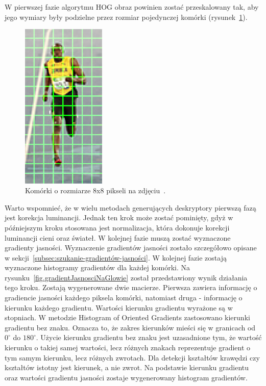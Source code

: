 \documentclass[a4paper,twoside,12pt]{book}
\begin{document}
    W pierwszej fazie algorytmu HOG obraz powinien zostać przeskalowany tak, aby jego wymiary były podzielne przez
    rozmiar
    pojedynczej komórki
    (rysunek~\ref{fig.komorkiHoga}).
    \begin{figure}
        \centering
        \includegraphics[width=4cm]{Obrazy/komorkiHoga.jpg}
        \caption{Komórki o rozmiarze 8x8 pikseli na zdjęciu~\cite{hogOpenCv}.}
        \label{fig.komorkiHoga}
    \end{figure}
    Warto wspomnieć, że w wielu metodach generujących deskryptory pierwszą fazą jest korekcja luminancji.
    Jednak ten krok może zostać pominięty, gdyż w późniejszym kroku stosowana jest normalizacja,
    która dokonuje korekcji luminancji cieni oraz świateł.
    W kolejnej fazie muszą zostać wyznaczone gradienty jasności.
    Wyznaczenie gradientów jasności zostało szczegółowo opisane w sekcji~\ref{subsec:szukanie-gradientów-jasności}.
    W kolejnej fazie zostają wyznaczone histogramy gradientów dla każdej komórki.
    Na rysunku~\ref{fig.gradientJasnosciNaGlowie} został przedstawiony wynik działania tego kroku.
    Zostają wygenerowane dwie macierze. Pierwsza zawiera informację o gradiencie jasności każdego piksela komórki,
    natomiast druga - informację o kierunku każdego gradientu.
    Wartości kierunku gradientu wyrażone są w stopniach. W metodzie Histogram of Oriented Gradients
    zastosowano kierunki gradientu bez znaku. Oznacza to, że zakres kierunków mieści się w granicach
    od $0^{\circ}$ do $180^{\circ}$.
    Użycie kierunku gradientu bez znaku jest uzasadnione tym,
    że wartość kierunku o takiej samej wartości, lecz różnych znakach reprezentuje gradient o tym samym kierunku, lecz
    różnych zwrotach. Dla detekcji kształtów krawędzi czy kształtów istotny jest kierunek, a nie zwrot.
    Na podstawie kierunku gradientu oraz wartości gradientu jasności zostaje wygenerowany histogram gradientów.
\end{document}
